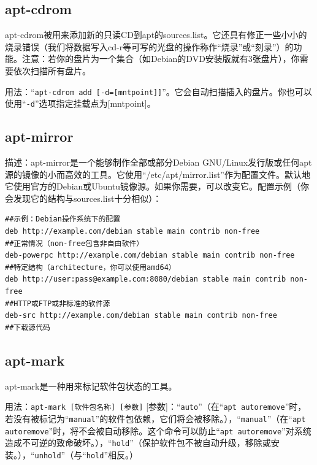 \subsection{apt-cdrom}
\cite{manaptcd}\par
apt-cdrom被用来添加新的只读CD到apt的sources.list。它还具有修正一些小小的烧录错误（我们将数据写入cd-r等可写的光盘的操作称作“烧录”或“刻录”）的功能。注意：若你的盘片为一个集合（如Debian的DVD安装版就有3张盘片），你需要依次扫描所有盘片。\par
用法：“\verb|apt-cdrom add [-d=[mntpoint]]|”。它会自动扫描插入的盘片。你也可以使用“\verb|-d|”选项指定挂载点为[mntpoint]。\par
\subsection{apt-mirror}
描述：apt-mirror是一个能够制作全部或部分Debian GNU/Linux发行版或任何apt源的镜像的小而高效的工具。它使用“/etc/apt/mirror.list”作为配置文件。默认地它使用官方的Debian或Ubuntu镜像源。如果你需要，可以改变它。配置示例（你会发现它的结构与sources.list十分相似）：
\begin{verbatim}
##示例：Debian操作系统下的配置
deb http://example.com/debian stable main contrib non-free
##正常情况（non-free包含非自由软件）
deb-powerpc http://example.com/debian stable main contrib non-free
##特定结构（architecture，你可以使用amd64）
deb http://user:pass@example.com:8080/debian stable main contrib non-free
##HTTP或FTP或非标准的软件源
deb-src http://example.com/debian stable main contrib non-free
##下载源代码
\end{verbatim}
\subsection{apt-mark}
\cite{manaptmark}\par
apt-mark是一种用来标记软件包状态的工具。\par
用法：\verb|apt-mark [软件包名称] [参数]|
[参数]：“\verb|auto|”（在“\verb|apt autoremove|”时，若没有被标记为“\verb|manual|”的软件包依赖，它们将会被移除。），“\verb|manual|”（在“\verb|apt autoremove|”时，将不会被自动移除。{\color{red}这个命令可以防止“\verb|apt autoremove|”对系统造成不可逆的致命破坏。}），“\verb|hold|”（保护软件包不被自动升级，移除或安装。），“\verb|unhold|”（与“\verb|hold|”相反。）
